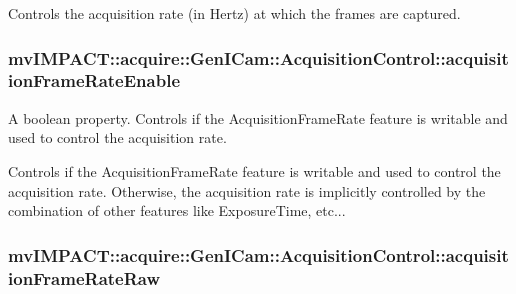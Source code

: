 Controls the acquisition rate (in Hertz) at which the frames are captured. \hypertarget{classmv_i_m_p_a_c_t_1_1acquire_1_1_gen_i_cam_1_1_acquisition_control_a87e6ccd44f43111f4e1969175e04db0e}{
\subsubsection[{acquisition\+Frame\+Rate\+Enable}]{ mv\+I\+M\+P\+A\+C\+T\+::acquire\+::\+Gen\+I\+Cam\+::\+Acquisition\+Control\+::acquisition\+Frame\+Rate\+Enable}}\label{classmv_i_m_p_a_c_t_1_1acquire_1_1_gen_i_cam_1_1_acquisition_control_a87e6ccd44f43111f4e1969175e04db0e}


A boolean property. Controls if the Acquisition\+Frame\+Rate feature is writable and used to control the acquisition rate. 

Controls if the Acquisition\+Frame\+Rate feature is writable and used to control the acquisition rate. Otherwise, the acquisition rate is implicitly controlled by the combination of other features like Exposure\+Time, etc... \hypertarget{classmv_i_m_p_a_c_t_1_1acquire_1_1_gen_i_cam_1_1_acquisition_control_ae005cee593783684117beca6ec37c183}{
\subsubsection[{acquisition\+Frame\+Rate\+Raw}]{ mv\+I\+M\+P\+A\+C\+T\+::acquire\+::\+Gen\+I\+Cam\+::\+Acquisition\+Control\+::acquisition\+Frame\+Rate\+Raw}}\label{classmv_i_m_p_a_c_t_1_1acquire_1_1_gen_i_cam_1_1_acquisition_control_ae005cee593783684117beca6ec37c183}



